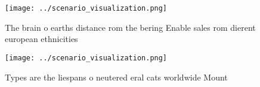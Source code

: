 \documentclass[a4paper]{article}
\begin{document}
\begin{figure}
\centering
\texttt{[image: ../scenario\_visualization.png]}
\caption{The brain o earths distance rom the bering Enable sales rom dierent european ethnicities 
}
\end{figure}
 
\begin{figure}
\centering
\texttt{[image: ../scenario\_visualization.png]}
\caption{Types are the liespans o neutered eral cats worldwide Mount
}
\end{figure}
 
\end{document}
